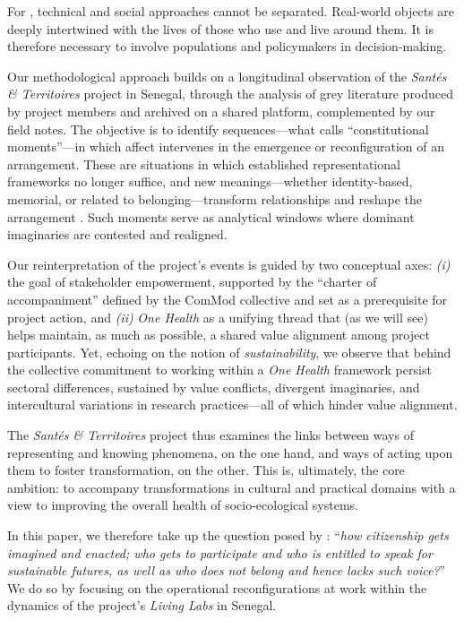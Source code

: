 \documentclass{article}
\begin{document}
For \textcite{pfotenhauer_learning_2012}, technical and social approaches cannot be separated. Real-world objects are deeply intertwined with the lives of those who use and live around them. It is therefore necessary to involve populations and policymakers in decision-making.  

Our methodological approach builds on a longitudinal observation of the \textit{\textit{Santés \& Territoires}} project in Senegal, through the analysis of grey literature produced by project members and archived on a shared platform, complemented by our field notes. The objective is to identify sequences—what \textcite{jasanoff_constitutional_2011} calls “constitutional moments”—in which affect intervenes in the emergence or reconfiguration of an arrangement. These are situations in which established representational frameworks no longer suffice, and new meanings—whether identity-based, memorial, or related to belonging—transform relationships and reshape the arrangement \parencite{hertz_knowledge_2025}. Such moments serve as analytical windows where dominant imaginaries are contested and realigned.  

Our reinterpretation of the project’s events is guided by two conceptual axes: \textit{(i)} the goal of stakeholder empowerment, supported by the “charter of accompaniment” defined by the ComMod collective \parencite{barreteau_our_2003} and set as a prerequisite for project action, and \textit{(ii)} \textit{One Health} as a unifying thread that (as we will see) helps maintain, as much as possible, a shared value alignment among project participants. Yet, echoing \textcite[p.144]{beck_governance_2021} on the notion of \textit{sustainability}, we observe that behind the collective commitment to working within a \textit{One Health} framework persist sectoral differences, sustained by value conflicts, divergent imaginaries, and intercultural variations in research practices—all of which hinder value alignment.  

The \textit{Santés \& Territoires} project thus examines the links between ways of representing and knowing phenomena, on the one hand, and ways of acting upon them to foster transformation, on the other. This is, ultimately, the core ambition: to accompany transformations in cultural and practical domains with a view to improving the overall health of socio-ecological systems.  

In this paper, we therefore take up the question posed by \textcite[p.148]{beck_governance_2021}: “\textit{how citizenship gets imagined and enacted; who gets to participate and who is entitled to speak for sustainable futures, as well as who does not belong and hence lacks such voice?}” We do so by focusing on the operational reconfigurations at work within the dynamics of the project’s \textit{Living Labs} in Senegal. 
\end{document}
